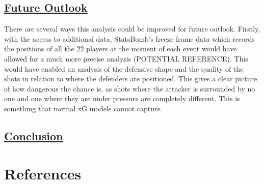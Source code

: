 \documentclass[
  11pt,
  letterpaper,
  DIV=11,
  numbers=noendperiod]{scrartcl}
\begin{document}
\subsection{\texorpdfstring{\ul{Future
Outlook}}{Future Outlook}}\label{future-outlook}

There are several ways this analysis could be improved for future
outlook. Firstly, with the access to additional data, StatsBomb's freeze
frame data which records the positions of all the 22 players at the
moment of each event would have allowed for a much more precise analysis
(POTENTIAL REFERENCE). This would have enabled an analysis of the
defensive shape and the quality of the shots in relation to where the
defenders are positioned. This gives a clear picture of how dangerous
the chance is, as shots where the attacker is surrounded by no one and
one where they are under pressure are completely different. This is
something that normal xG models cannot capture.

\subsection{\texorpdfstring{\ul{Conclusion}}{Conclusion}}\label{conclusion}

\section{References}\label{references}
\end{document}
